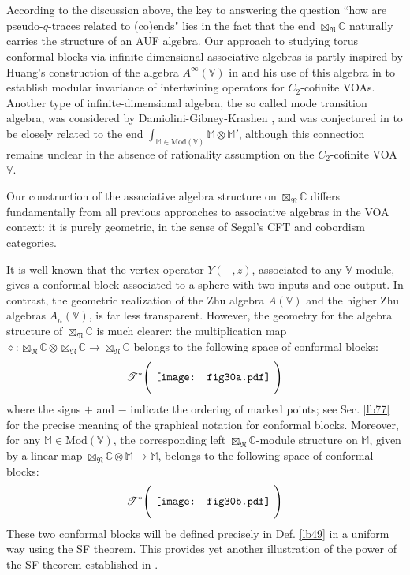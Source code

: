 \documentclass[11pt,b5paper,notitlepage]{article}
\theoremstyle{definition}
\theoremstyle{plain}
\newcommand{\Vbb}{\mathbb V}
\newcommand{\Mbb}{\mathbb M}
\newcommand{\Cbb}{\mathbb C}
\newcommand{\<}{\left\langle}
\renewcommand{\>}{\right\rangle}
\newcommand{\ST}{\mathscr{T}}
\newcommand{\Mod}{\mathrm{Mod}}
\newcommand{\fn}{\mathfrak{N}}
\numberwithin{equation}{section}
\begin{document}
According to the discussion above, the key to answering the question ``how are pseudo-$q$-traces related to (co)ends" lies in the fact that the end $\boxtimes_\fn\Cbb$ naturally carries the structure of an AUF algebra. Our approach to studying torus conformal blocks via infinite-dimensional associative algebras is partly inspired by Huang’s construction of the algebra $A^\infty(\Vbb)$ in \cite{Hua-associative,Hua22-Ass-IO} and his use of this algebra in \cite{Hua-modular-C2} to establish modular invariance of intertwining operators for $C_2$-cofinite VOAs. Another type of infinite-dimensional algebra, the so called mode transition algebra, was considered by Damiolini-Gibney-Krashen \cite{DGK2,DGK3-morita}, and was conjectured in \cite{DW-modular-functor} to be closely related to the end $\int_{\Mbb\in\Mod(\Vbb)}\Mbb\otimes\Mbb'$, although this connection remains unclear in the absence of rationality assumption on the $C_2$-cofinite VOA $\Vbb$.


Our construction of the associative algebra structure on $\boxtimes_\fn\Cbb$ differs fundamentally from all previous approaches to associative algebras in the VOA context: it is purely geometric, in the sense of Segal's CFT and cobordism categories. 

It is well-known that the vertex operator $Y(-,z)$, associated to any $\Vbb$-module, gives a conformal block associated to a sphere with two inputs and one output. In contrast, the geometric realization of the Zhu algebra $A(\Vbb)$ and the higher Zhu algebras $A_n(\Vbb)$, is far less transparent. However, the geometry for the algebra structure of $\boxtimes_\fn\Cbb$ is much clearer: the multiplication map $\diamond:\boxtimes_\fn\Cbb\otimes\boxtimes_\fn\Cbb\rightarrow\boxtimes_\fn\Cbb$ belongs to the following space of conformal blocks:
\begin{align}\label{eq143}
\ST^*\Bigg(\vcenter{\hbox{{
		\texttt{[image: fig30a.pdf]}}}}~\Bigg)
\end{align}
where the signs $+$ and $-$ indicate the ordering of marked points; see Sec. \ref{lb77} for the precise meaning of the graphical notation for conformal blocks. Moreover, for any $\Mbb\in\Mod(\Vbb)$, the corresponding left $\boxtimes_\fn\Cbb$-module structure on $\Mbb$, given by a linear map $\boxtimes_\fn\Cbb\otimes\Mbb\rightarrow\Mbb$, belongs to the following space of conformal blocks:
\begin{align}
\ST^*\Bigg(\vcenter{\hbox{{
		\texttt{[image: fig30b.pdf]}}}}~\Bigg)
\end{align}
These two conformal blocks will be defined precisely in Def. \ref{lb49} in a uniform way using the SF theorem. This provides yet another illustration of the power of the SF theorem established in \cite{GZ3}.
\end{document}
